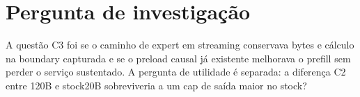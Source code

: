 \section{Pergunta de investigação}
A questão C3 foi se o caminho de expert em streaming conservava bytes e cálculo na boundary capturada e se o preload causal já existente melhorava o prefill sem perder o serviço sustentado. A pergunta de utilidade é separada: a diferença C2 entre 120B e stock20B sobreviveria a um cap de saída maior no stock? 
